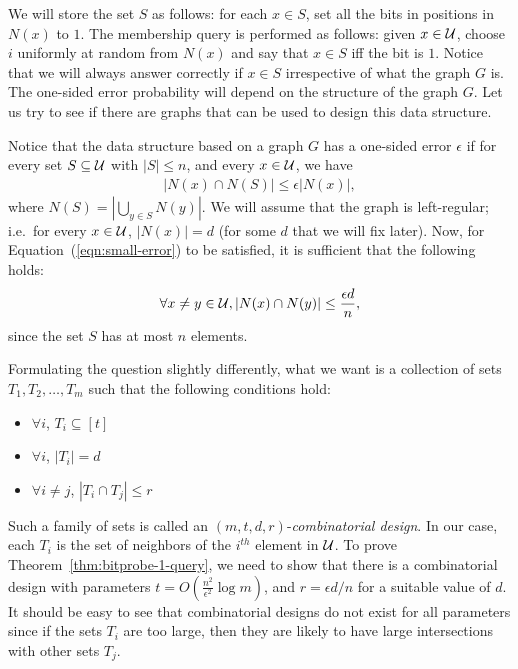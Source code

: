We will store the set $S$ as follows: for each $x\in S$, set all the bits in
positions in $N(x)$ to $1$. The membership query is performed as follows: given
$x\in {\cal U}$, choose $i$ uniformly at random from $N(x)$ and say that
$x\in S$ iff the bit is $1$. Notice that we will always answer correctly if
$x\in S$ irrespective of what the graph $G$ is. The one-sided error probability
will depend on the structure of the graph $G$. Let us try to see if there are
graphs that can be used to design this data structure.

Notice that the data structure based on a graph $G$ has a one-sided error
$\epsilon$ if for every set $S\subseteq {\cal U}$ with $|S| \leq n$, and every
$x\in {\cal U}$, we have
\begin{align}
  |N(x) \cap N(S)| \leq \epsilon |N(x)|,
  \label{eqn:small-error}
\end{align}
where $N(S) = \left| \bigcup_{y\in S} N(y) \right|$. We will assume that the
graph is left-regular; i.e.\ for every $x\in {\cal U}$, $|N(x)| = d$ (for some
$d$ that we will fix later). Now, for Equation~(\ref{eqn:small-error}) to be
satisfied, it is sufficient that the following holds:
\begin{align}
  \forall x\neq y \in {\cal U}, |N(x) \cap N(y)| \leq \frac{\epsilon d}{n},
  \label{eqn:small-error-suff}
\end{align}
since the set $S$ has at most $n$ elements.

Formulating the question slightly differently, what we want is a collection of
sets $T_1, T_2, \ldots, T_m$ such that the following conditions hold:
\begin{itemize}
\item $\forall i$, $T_i \subseteq [t]$
\item $\forall i$, $|T_i| = d$
\item $\forall i\neq j$, $|T_i \cap T_j| \leq r$
\end{itemize}

Such a family of sets is called an $(m,t,d,r)$-\emph{combinatorial design}. In
our case, each $T_i$ is the set of neighbors of the $i^{th}$ element in
${\cal U}$. To prove Theorem~\ref{thm:bitprobe-1-query}, we need to show that
there is a combinatorial design with parameters
$t = O\left( \frac{n^2}{\epsilon^2}\log m \right)$, and $r = \epsilon d/n$ for a
suitable value of $d$. It should be easy to see that combinatorial designs do
not exist for all parameters since if the sets $T_i$ are too large, then they
are likely to have large intersections with other sets $T_j$.

